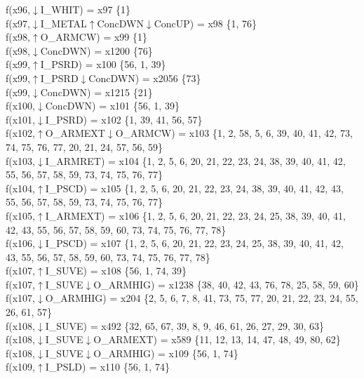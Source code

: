f(x96,$\downarrow$I\_WHIT) = x97 \{1\} \\  
f(x97,$\downarrow$I\_METAL$\uparrow$ConcDWN$\downarrow$ConcUP) = x98 \{1, 76\} \\  
f(x98,$\uparrow$O\_ARMCW) = x99 \{1\} \\  
f(x98,$\downarrow$ConcDWN) = x1200 \{76\} \\  
f(x99,$\uparrow$I\_PSRD) = x100 \{56, 1, 39\} \\  
f(x99,$\uparrow$I\_PSRD$\downarrow$ConcDWN) = x2056 \{73\} \\  
f(x99,$\downarrow$ConcDWN) = x1215 \{21\} \\  
f(x100,$\downarrow$ConcDWN) = x101 \{56, 1, 39\} \\  
f(x101,$\downarrow$I\_PSRD) = x102 \{1, 39, 41, 56, 57\} \\  
f(x102,$\uparrow$O\_ARMEXT$\downarrow$O\_ARMCW) = x103 \{1, 2, 58, 5, 6, 39, 40, 41, 42, 73, 74, 75, 76, 77, 20, 21, 24, 57, 56, 59\} \\  
f(x103,$\downarrow$I\_ARMRET) = x104 \{1, 2, 5, 6, 20, 21, 22, 23, 24, 38, 39, 40, 41, 42, 55, 56, 57, 58, 59, 73, 74, 75, 76, 77\} \\  
f(x104,$\uparrow$I\_PSCD) = x105 \{1, 2, 5, 6, 20, 21, 22, 23, 24, 38, 39, 40, 41, 42, 43, 55, 56, 57, 58, 59, 73, 74, 75, 76, 77\} \\  
f(x105,$\uparrow$I\_ARMEXT) = x106 \{1, 2, 5, 6, 20, 21, 22, 23, 24, 25, 38, 39, 40, 41, 42, 43, 55, 56, 57, 58, 59, 60, 73, 74, 75, 76, 77, 78\} \\  
f(x106,$\downarrow$I\_PSCD) = x107 \{1, 2, 5, 6, 20, 21, 22, 23, 24, 25, 38, 39, 40, 41, 42, 43, 55, 56, 57, 58, 59, 60, 73, 74, 75, 76, 77, 78\} \\  
f(x107,$\uparrow$I\_SUVE) = x108 \{56, 1, 74, 39\} \\  
f(x107,$\uparrow$I\_SUVE$\downarrow$O\_ARMHIG) = x1238 \{38, 40, 42, 43, 76, 78, 25, 58, 59, 60\} \\  
f(x107,$\downarrow$O\_ARMHIG) = x204 \{2, 5, 6, 7, 8, 41, 73, 75, 77, 20, 21, 22, 23, 24, 55, 26, 61, 57\} \\  
f(x108,$\downarrow$I\_SUVE) = x492 \{32, 65, 67, 39, 8, 9, 46, 61, 26, 27, 29, 30, 63\} \\  
f(x108,$\downarrow$I\_SUVE$\downarrow$O\_ARMEXT) = x589 \{11, 12, 13, 14, 47, 48, 49, 80, 62\} \\  
f(x108,$\downarrow$I\_SUVE$\downarrow$O\_ARMHIG) = x109 \{56, 1, 74\} \\  
f(x109,$\uparrow$I\_PSLD) = x110 \{56, 1, 74\} \\  
